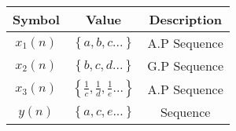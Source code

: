 \begin{tabular}{|c|c|c|}
    \hline
     \textbf{Symbol} & \textbf{Value} &
     \textbf{Description} \\
    \hline
     $x_1(n)$ & $\left\{a,b,c...\right\}$ & A.P Sequence\\[6pt]
    \hline
     $x_2(n)$ & $\left\{b,c,d...\right\}$ & G.P Sequence\\[6pt]
    \hline
     $x_3(n)$ & $\left\{\frac{1}{c}, \frac{1}{d}, \frac{1}{e}...\right\}$
 &  A.P Sequence\\[6pt]
    \hline
     $y(n)$   & $\left\{a,c,e...\right\}$  & Sequence\\[6pt]
    \hline
\end{tabular}

